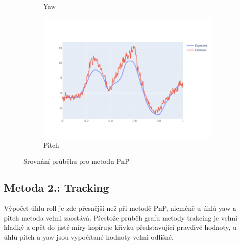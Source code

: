 \documentclass[12pt,a4paper,titlepage,final]{report}
\begin{document}
\begin{figure}[H]
\begin{subfigure}[b]{0.32\textwidth}
   \caption{Yaw}
    \label{fig:pnp_yaw}
  \end{subfigure}
  \hfill
    \begin{subfigure}[b]{0.32\textwidth}
    \includegraphics[width=\textwidth]{images/evaluation/3D_model_pitch_user_01_video_07.png}
   \caption{Pitch}
    \label{fig:pnp_pitch}
  \end{subfigure}
  \caption{Srovnání průběhu pro metodu PnP}
  \label{fig:pnp_graphs}
\end{figure}

\subsection{Metoda 2.: Tracking}
Výpočet úhlu roll je zde přesnější než při metodě PnP, nicméně u úhlů yaw a pitch metoda velmi zaostává. Přestože průběh grafu metody trakcing je velmi hladký a opět do jisté míry kopíruje křivku představující pravdivé hodnoty, u úhlů pitch a yaw jsou vypočítané hodnoty velmi odlišné.
\end{document}
